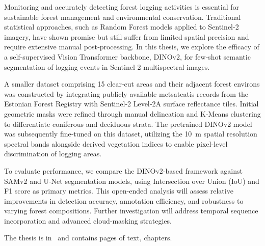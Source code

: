 Monitoring and accurately detecting forest logging activities is essential for sustainable forest management and environmental conservation. Traditional statistical approaches, such as Random Forest models applied to Sentinel-2 imagery, have shown promise but still suffer from limited spatial precision and require extensive manual post‑processing. In this thesis, we explore the efficacy of a self‑supervised Vision Transformer backbone, DINOv2, for few‑shot semantic segmentation of logging events in Sentinel‑2 multispectral images.

A smaller dataset comprising 15 clear‑cut areas and their adjacent forest environs was constructed by integrating publicly available metsateatis records from the Estonian Forest Registry with Sentinel‑2 Level‑2A surface reflectance tiles. Initial geometric masks were refined through manual delineation and K‑Means clustering to differentiate coniferous and deciduous strata. The pretrained DINOv2 model was subsequently fine‑tuned on this dataset, utilizing the 10 m spatial resolution spectral bands alongside derived vegetation indices to enable pixel‑level discrimination of logging areas.

To evaluate performance, we compare the DINOv2‑based framework against SAMv2 and U‑Net segmentation models, using Intersection over Union (IoU) and F1 score as primary metrics. This open-ended analysis will assess relative improvements in detection accuracy, annotation efficiency, and robustness to varying forest compositions. Further investigation will address temporal sequence incorporation and advanced cloud‑masking strategies.


The thesis is in \langEng~and contains \calculatepages pages of text, 
 chapters.
